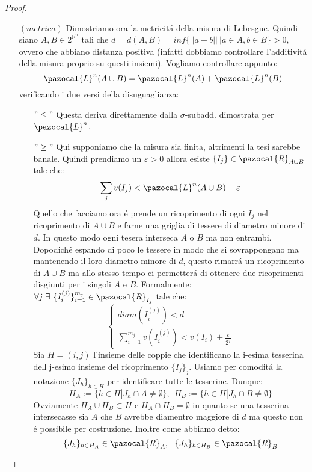 \documentclass[11pt,a4paper]{report}
\theoremstyle{plain}
\theoremstyle{definition}
\newcommand{\Le}{\pazocal{L}}
\begin{document}
\begin{proof}
\begin{itemize}
	\item[$(metrica)$]Dimostriamo ora la metricit\'a della misura di Lebesgue. Quindi siano $A,B \in 2^{\mathbb{R}^n}$ tali che $d = d(A,B) = inf \{||a-b||\ | a \in A, b\in B\} > 0$, ovvero che abbiano distanza positiva (infatti dobbiamo controllare l'additivit\'a della misura proprio su questi insiemi). Vogliamo controllare appunto:
	\[
		\Le^n(A\cup B) = \Le^n(A) + \Le^n(B)
	\]
	verificando i due versi della disuguaglianza:
	\begin{itemize}
		\item[$"\le"$] Questa deriva direttamente dalla $\sigma$-subadd. dimostrata per $\Le^n$.
		\item[$"\ge"$] Qui supponiamo che la misura sia finita, altrimenti la tesi sarebbe banale. Quindi prendiamo un $\varepsilon > 0$ allora esiste $\{I_j\} \in \pazocal{R}_{A\cup B}$ tale che: 
		\begin{equation}
		\sum\limits_jv(I_j) < \Le^n(A\cup B) + \varepsilon
		\end{equation}
		Quello che facciamo ora \'e prende un ricoprimento di ogni $I_j$ nel ricoprimento di $A \cup B$ e farne una griglia di tessere di diametro minore di $d$. In questo modo ogni tesera interseca $A$ o $B$ ma non entrambi. Dopodich\'e espando di poco le tessere in modo che si sovrappongano ma mantenendo il loro diametro minore di $d$, questo rimarr\'a un ricoprimento di $A\cup B$ ma allo stesso tempo ci permetter\'a di ottenere due ricoprimenti disgiunti per i singoli $A$ e $B$. Formalmente:
			$\forall j\ \exists\ \{I_{i}^{(j)}\}_{i=1}^{m_j} \in \pazocal{R}_{I_j}$ tale che:
	\begin{equation}
		\begin{cases}
			diam(I_{i}^{(j)}) < d \\
			\sum\limits_{i=1}^{m_j} v(I_{i}^{(j)}) < v(I_i) + \frac{\varepsilon}{2^j}
		\end{cases}
	\end{equation}
	Sia $H = {(i,j)}$ l'insieme delle coppie che identificano la i-esima tesserina dell j-esimo insieme del ricoprimento $\{I_j\}_j$.
	Usiamo per comodit\'a la notazione $\{J_h\}_{h \in H}$ per identificare tutte le tesserine. Dunque:
	\[
		H_A := \{h \in H | J_h \cap A \ne \emptyset\},\ \ H_B := \{h \in H | J_h \cap B \ne \emptyset\}	
	\]
	Ovviamente $H_A \cup H_B \subset H$ e $H_A \cap H_B = \emptyset$ in quanto se una tesserina intersecasse sia $A$ che $B$ avrebbe diamentro maggiore di $d$ ma questo non \'e possibile per costruzione. Inoltre come abbiamo detto:
	\[
		\{J_h\}_{h \in H_A} \in \pazocal{R}_A,\ \ \{J_h\}_{h \in H_B} \in \pazocal{R}_B
\]
\end{itemize}
\end{itemize}
\end{proof}
\end{document}
